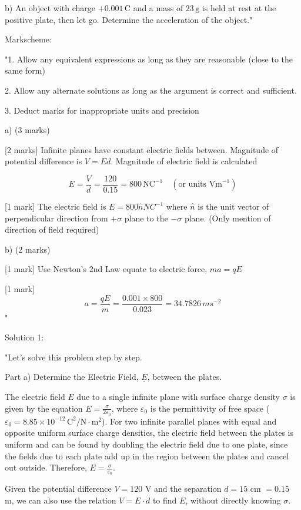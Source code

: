 b) An object with charge \( +0.001 \, \text{C} \) and a mass of \( 23 \, \text{g} \) is held at rest at the positive plate, then let go. Determine the acceleration of the object."

Markscheme:

"1. Allow any equivalent expressions as long as they are reasonable (close to the same form)

2. Allow any alternate solutions as long as the argument is correct and sufficient. 

3. Deduct marks for inappropriate units and precision

a) (3 marks)

[2 marks] Infinite planes have constant electric fields between. Magnitude of potential difference is \( V = Ed \). Magnitude of electric field is calculated 

\[ E = \frac{V}{d} = \frac{120}{0.15} = 800 \, \text{NC}^{-1} \quad (\text{or units } \mathrm{Vm}^{-1}) \]

[1 mark] The electric field is \(E = 800 \hat{n} NC^{-1} \) where \( \hat{n} \) is the unit vector of perpendicular direction from \( +\sigma \) plane to the \( -\sigma \) plane. (Only mention of direction of field required)

b) (2 marks)

[1 mark] Use Newton’s 2nd Law equate to electric force, \( ma = qE \)

[1 mark] \[ a = \frac{qE}{m} = \frac{0.001 \times 800}{0.023} = 34.7826 \, ms^{-2} \]
"

Solution 1: 

"Let's solve this problem step by step.

Part a) Determine the Electric Field, \( \underline{E} \), between the plates.

The electric field \( E \) due to a single infinite plane with surface charge density \( \sigma \) is given by the equation \( E = \frac{\sigma}{2\varepsilon_0} \), where \( \varepsilon_0 \) is the permittivity of free space (\( \varepsilon_0 = 8.85 \times 10^{-12} \, \text{C}^2/\text{N}\cdot\text{m}^2 \)). For two infinite parallel planes with equal and opposite uniform surface charge densities, the electric field between the plates is uniform and can be found by doubling the electric field due to one plate, since the fields due to each plate add up in the region between the plates and cancel out outside. Therefore, \( E = \frac{\sigma}{\varepsilon_0} \).

Given the potential difference \( V = 120 \) V and the separation \( d = 15 \) cm \( = 0.15 \) m, we can also use the relation \( V = E \cdot d \) to find \( E \), without directly knowing \( \sigma \).

